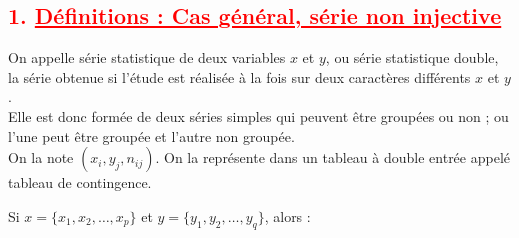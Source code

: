 \documentclass[12pt,a4paper]{article}
\begin{document}
\subsection*{\textcolor{red}{1. \underline{Définitions : Cas général, série non injective}}}

On appelle série statistique de deux variables \( x \) et \( y \), ou série statistique double, la série obtenue si l’étude est réalisée à la fois sur deux caractères différents \( x \) et \( y \). \\
Elle est donc formée de deux séries simples qui peuvent être groupées ou non ; ou l’une peut être groupée et l’autre non groupée.\\
On la note \( (x_i, y_j, n_{ij}) \). On la représente dans un tableau à double entrée appelé tableau de contingence.

\vspace{0.2cm}
Si \( x = \{x_1, x_2, \dots, x_p\} \) et \( y = \{y_1, y_2, \dots, y_q\} \), alors :
\end{document}

